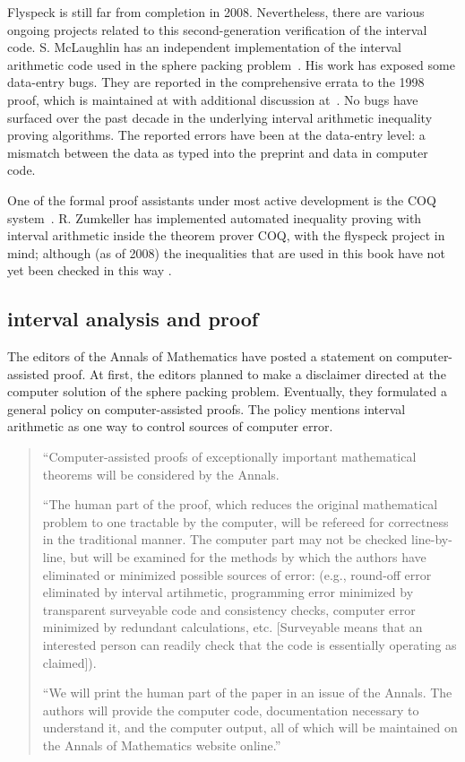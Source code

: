 Flyspeck is still far from completion in 2008.  Nevertheless, 
there are various ongoing
projects
related to this second-generation verification of the interval code.
S. McLaughlin has an independent implementation of the interval arithmetic
code used in the sphere packing problem~\cite{McL08}.  
His work has exposed some data-entry bugs.  They are reported
in the comprehensive errata to the 1998 proof, 
which is maintained at \cite{errata} with additional discussion at~\cite{flydis}.  
No bugs have surfaced
over the past decade 
in the underlying interval arithmetic inequality proving algorithms.  The
reported errors have been at the data-entry level:  a mismatch between 
the data as typed
into the preprint and data in computer code.

One of the formal proof assistants under most active development
is the COQ system~\cite{COQ}.  R. Zumkeller
has implemented automated inequality proving with interval arithmetic
inside the theorem prover COQ, with the flyspeck project in
mind; although (as of 2008) the inequalities
that are used in this book have not yet been checked in this way \cite{Zu}.


\subsection{interval analysis and proof}


The editors of the Annals of Mathematics have posted a statement on computer-assisted proof.
At first, the editors planned to make a disclaimer directed at the
computer solution of the sphere packing problem.  Eventually,  they formulated a general policy
on computer-assisted proofs.  The policy mentions interval arithmetic as one way to
control sources of computer error.


\begin{quote}

``Computer-assisted proofs of exceptionally important mathematical theorems will be considered by the Annals.

``The human part of the proof, which reduces the original mathematical problem to one tractable by the computer, will be refereed for correctness in the traditional manner. The computer part may not be checked line-by-line, but will be examined for the methods by which the authors have eliminated or minimized possible sources of error: (e.g., round-off error eliminated by interval artihmetic, programming error minimized by transparent surveyable code and consistency checks, computer error minimized by redundant calculations, etc. [Surveyable means that an interested person can readily check that the code is essentially operating as claimed]).

``We will print the human part of the paper in an issue of the Annals. The authors will provide the computer code, documentation necessary to understand it, and the computer output, all of which will be maintained on the Annals of Mathematics website online.'' \cite{Ann06}

\end{quote}

